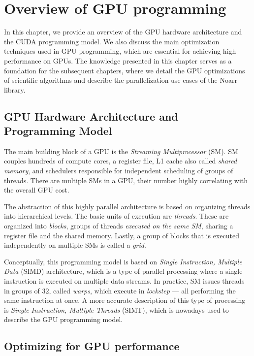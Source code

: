 \chapter{Overview of GPU programming}
\label{chap:gpu_intro}

In this chapter, we provide an overview of the GPU hardware architecture and the CUDA programming model. We also discuss the main optimization techniques used in GPU programming, which are essential for achieving high performance on GPUs. The knowledge presented in this chapter serves as a foundation for the subsequent chapters, where we detail the GPU optimizations of scientific algorithms and describe the parallelization use-cases of the Noarr library.

\section{GPU Hardware Architecture and Programming Model}
\label{sec:gpu_arch}


The main building block of a GPU is the \emph{Streaming Multiprocessor} (SM). SM couples hundreds of compute cores, a register file, L1 cache also called \emph{shared memory}, and schedulers responsible for independent scheduling of groups of threads. There are multiple SMs in a GPU, their number highly correlating with the overall GPU cost.

The abstraction of this highly parallel architecture is based on organizing threads into hierarchical levels. The basic units of execution are \emph{threads}. These are organized into \emph{blocks}, groups of threads \emph{executed on the same SM}, sharing a register file and the shared memory. Lastly, a group of blocks that is executed independently on multiple SMs is called a \emph{grid}.

Conceptually, this programming model is based on \emph{Single Instruction, Multiple Data} (SIMD) architecture, which is a type of parallel processing where a single instruction is executed on multiple data streams. In practice, SM issues threads in groups of $32$, called \emph{warps}, which execute in \emph{lockstep} --- all performing the same instruction at once. A more accurate description of this type of processing is \emph{Single Instruction, Multiple Threads} (SIMT), which is nowadays used to describe the GPU programming model.

\section{Optimizing for GPU performance}
\label{sec:gpu_optim}

